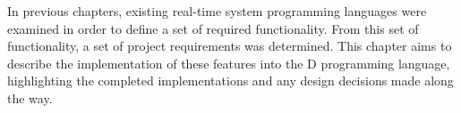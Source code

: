 











In previous chapters,
existing real-time system programming languages were examined in order to
define a set of required functionality. From this
set of functionality, a set of project requirements was determined. This
chapter aims to describe the implementation of these features into the D
programming language, highlighting the completed implementations and any design 
decisions made along the way. 

